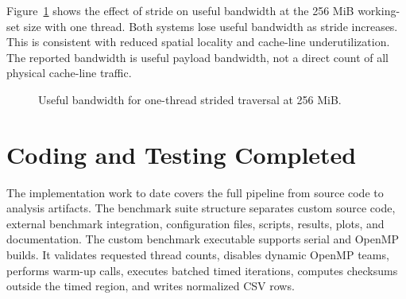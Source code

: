 \documentclass[11pt]{article}
\begin{document}
Figure~\ref{fig:stride-line} shows the effect of stride on useful bandwidth at the 256 MiB working-set size with one thread. Both systems lose useful bandwidth as stride increases. This is consistent with reduced spatial locality and cache-line underutilization. The reported bandwidth is useful payload bandwidth, not a direct count of all physical cache-line traffic.

\begin{figure}[htbp]
\centering
{}
\caption{Useful bandwidth for one-thread strided traversal at 256 MiB.}
\label{fig:stride-line}
\end{figure}

\section{Coding and Testing Completed}

The implementation work to date covers the full pipeline from source code to analysis artifacts. The benchmark suite structure separates custom source code, external benchmark integration, configuration files, scripts, results, plots, and documentation. The custom benchmark executable supports serial and OpenMP builds. It validates requested thread counts, disables dynamic OpenMP teams, performs warm-up calls, executes batched timed iterations, computes checksums outside the timed region, and writes normalized CSV rows.
\end{document}
